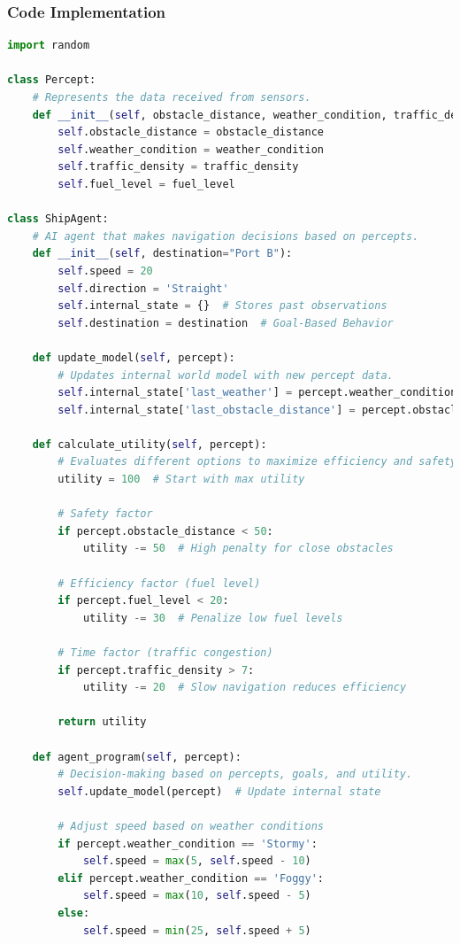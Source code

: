 \documentclass{article}
\begin{document}
\subsubsection{Code Implementation}
\begin{lstlisting}[language=Python, caption={AI Agent for Autonomous Ship Navigation}]
import random

class Percept:
    # Represents the data received from sensors.
    def __init__(self, obstacle_distance, weather_condition, traffic_density, fuel_level):
        self.obstacle_distance = obstacle_distance  
        self.weather_condition = weather_condition 
        self.traffic_density = traffic_density 
        self.fuel_level = fuel_level

class ShipAgent:
    # AI agent that makes navigation decisions based on percepts.
    def __init__(self, destination="Port B"):
        self.speed = 20  
        self.direction = 'Straight'
        self.internal_state = {}  # Stores past observations
        self.destination = destination  # Goal-Based Behavior
    
    def update_model(self, percept):
        # Updates internal world model with new percept data.
        self.internal_state['last_weather'] = percept.weather_condition
        self.internal_state['last_obstacle_distance'] = percept.obstacle_distance
    
    def calculate_utility(self, percept):
        # Evaluates different options to maximize efficiency and safety.
        utility = 100  # Start with max utility
        
        # Safety factor
        if percept.obstacle_distance < 50:
            utility -= 50  # High penalty for close obstacles
        
        # Efficiency factor (fuel level)
        if percept.fuel_level < 20:
            utility -= 30  # Penalize low fuel levels
        
        # Time factor (traffic congestion)
        if percept.traffic_density > 7:
            utility -= 20  # Slow navigation reduces efficiency
        
        return utility

    def agent_program(self, percept):
        # Decision-making based on percepts, goals, and utility.
        self.update_model(percept)  # Update internal state

        # Adjust speed based on weather conditions
        if percept.weather_condition == 'Stormy':
            self.speed = max(5, self.speed - 10)  
        elif percept.weather_condition == 'Foggy':
            self.speed = max(10, self.speed - 5)
        else:
            self.speed = min(25, self.speed + 5) 
        

\end{lstlisting}
\end{document}
